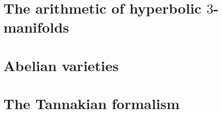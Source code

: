             \minitoc
            
        \begin{appendices}
            \chapter{The arithmetic of hyperbolic \texorpdfstring{$3$}{}-manifolds}
                \begin{abstract}
                    
                \end{abstract}
                
                \minitoc
                
                
                
                
                
                
                
                
                
            \chapter{Abelian varieties}
                \begin{abstract}
                    
                \end{abstract}
                
                \minitoc
                
                
                
                
                
                
                
            \chapter{The Tannakian formalism}
                \begin{abstract}
                    
                \end{abstract}
                
                \minitoc
                
                
                
                
        \end{appendices}
    
